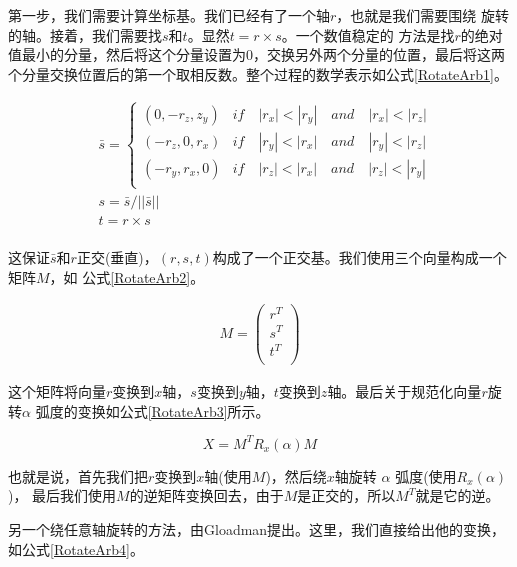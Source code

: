 \documentclass{ctexart}
\begin{document}
第一步，我们需要计算坐标基。我们已经有了一个轴$r$，也就是我们需要围绕
旋转的轴。接着，我们需要找$s$和$t$。显然$t=r\times s$。一个数值稳定的
方法是找$r$的绝对值最小的分量，然后将这个分量设置为0，交换另外两个分量的位置，最后将这两个分量交换位置后的第一个取相反数。整个过程的数学表示如公式\ref{RotateArb1}。

\begin{equation}
	\label{RotateArb1}
	\begin{split}
	&\bar{s}=\left\{
		\begin{array}{cc}
			(0,-r_{z},z_{y}) &if\quad |r_{x}|<|r_{y}|\quad and\quad|r_{x}|<|r_{z}|\\
			(-r_{z},0,r_{x}) &if\quad |r_{y}|<|r_{x}|\quad and\quad |r_{y}|<|r_{z}|\\
			(-r_{y},r_{x},0) &if\quad |r_{z}|<|r_{x}|\quad and\quad |r_{z}|<|r_{y}|\\
		\end{array}
	\right.\\
	&s=\bar{s}/||\bar{s}||\\
	&t=r\times s\\
	\end{split}
\end{equation}

这保证$\bar{s}$和$r$正交(垂直)，$(r,s,t)$构成了一个正交基。我们使用三个向量构成一个矩阵$M$，如
公式\ref{RotateArb2}。

\begin{equation}
	\label{RotateArb2}
	\begin{split}
		M=\left(
			\begin{array}{c}
				r^T\\
				s^T\\
				t^T\\
			\end{array}
		\right)
	\end{split}
\end{equation}

这个矩阵将向量$r$变换到$x$轴，$s$变换到$y$轴，$t$变换到$z$轴。最后关于规范化向量$r$旋转$\alpha$
弧度的变换如公式\ref{RotateArb3}所示。

\begin{equation}
	\label{RotateArb3}
	X=M^TR_{x}(\alpha)M
\end{equation}

也就是说，首先我们把$r$变换到$x$轴(使用$M$)，然后绕$x$轴旋转 $\alpha$ 弧度(使用$R_x(\alpha)$)，
最后我们使用$M$的逆矩阵变换回去，由于$M$是正交的，所以$M^T$就是它的逆。

另一个绕任意轴旋转的方法，由Gloadman提出。这里，我们直接给出他的变换，如公式\ref{RotateArb4}。
\end{document}
